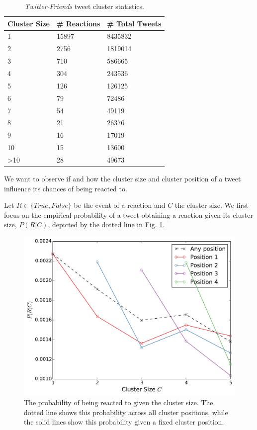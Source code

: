 \documentclass[onesided,asymmetric]{tufte-book}
\begin{document}
\begin{table}[h]
  \centering
  \selectfont
  \begin{tabular}{lll}
      \toprule
      \textbf{Cluster Size} & \textbf{\# Reactions} & \textbf{\# Total Tweets} \\
      \midrule
      1 &  15897 &   8435832 \\
      2 &  2756 &    1819014 \\
      3 &  710 & 586665 \\
      4 &  304 & 243536 \\
      5 &  126 & 126125 \\
      6 &  79 &  72486 \\
      7 &  54 &  49119 \\
      8 &  21 &  26376 \\
      9 &  16 &  17019 \\
      10 & 15 &  13600 \\
      >10 & 28 & 49673 \\
      \bottomrule
  \end{tabular}
  \caption{\textit{Twitter-Friends} tweet cluster statistics.}
  \label{table:cluster-statistics}
\end{table}

We want to observe if and how the cluster size and cluster position of a tweet influence its chances of being reacted to.

Let $R \in \{True, False\}$ be the event of a reaction and $C$ the cluster size. We first focus on the empirical probability of a tweet obtaining a reaction given its cluster size, $P(R | C)$, depicted by the dotted line in Fig. \ref{fig:retweet-distribution}.

\begin{figure}
    \includegraphics[width=\linewidth]{retweet_probability}
    \caption[Retweet probability for each cluster size.]{The probability of being reacted to given the cluster size. The dotted line shows this probability across all cluster positions, while the solid lines show this probability given a fixed cluster position.}
    \label{fig:retweet-distribution}
\end{figure}
\end{document}

